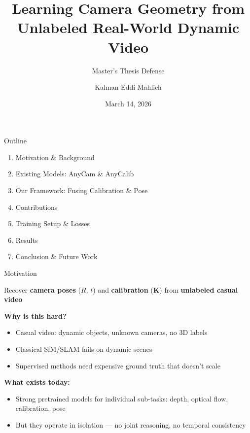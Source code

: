 \documentclass[
  english,
  aspectratio=169,
]{tumbeamer}
\title{Learning Camera Geometry from Unlabeled Real-World Dynamic Video}
\subtitle{Master's Thesis Defense}
\author{Kalman Eddi Mahlich}
\institute{%
  Supervisor: Prof.\ Dr.\ Daniel Cremers\\
  Advisor: Daniil Sinitsyn\\[2pt]
  \theChairName\\
  \theDepartmentName\\
  \theUniversityName%
}
\date[14/03/2026]{March 14, 2026}
\begin{document}
\maketitle


\begin{frame}{Outline}

\begin{enumerate}
  \setlength{\itemsep}{8pt}
  \item Motivation \& Background
  \item Existing Models: AnyCam \& AnyCalib
  \item Our Framework: Fusing Calibration \& Pose
  \item Contributions
  \item Training Setup \& Losses
  \item Results
  \item Conclusion \& Future Work
\end{enumerate}

\end{frame}


\begin{frame}{Motivation}

\vskip2pt
\begin{tcolorbox}[colback=TUMBlue!8, colframe=TUMBlue, boxrule=0.8pt, arc=3pt]
\centering
{\large Recover \textbf{camera poses} ($R$, $t$) and \textbf{calibration} ($\mathbf{K}$) from \textbf{unlabeled casual video}}
\end{tcolorbox}

\vskip10pt
\textbf{Why is this hard?}
\begin{itemize}
  \item Casual video: dynamic objects, unknown cameras, no 3D labels
  \item Classical SfM/SLAM fails on dynamic scenes
  \item Supervised methods need expensive ground truth that doesn't scale
\end{itemize}

\vskip10pt
\textbf{What exists today:}
\begin{itemize}
  \item Strong pretrained models for individual sub-tasks: depth, optical flow, calibration, pose
  \item But they operate \alert{in isolation} --- no joint reasoning, no temporal consistency
\end{itemize}

\end{frame}
\end{document}
